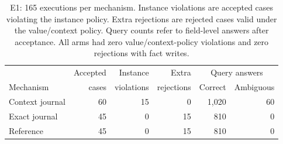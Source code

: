 \begin{table}[tb]
\centering
\small
\caption{E1: 165 executions per mechanism. Instance violations are accepted cases violating the instance policy. Extra rejections are rejected cases valid under the value/context policy. Query counts refer to field-level answers after acceptance. All arms had zero value/context-policy violations and zero rejections with fact writes.}
\label{tab:dke-comparator}
\setlength{\tabcolsep}{4pt}
\begin{tabularx}{\linewidth}{@{}Xrrrrr@{}}
\toprule
 & Accepted & Instance & Extra & \multicolumn{2}{c}{Query answers} \\
Mechanism & cases & violations & rejections & Correct & Ambiguous \\
\midrule
Context journal & 60 & 15 & 0 & 1,020 & 60 \\
Exact journal & 45 & 0 & 15 & 810 & 0 \\
Reference & 45 & 0 & 15 & 810 & 0 \\
\bottomrule
\end{tabularx}
\end{table}
